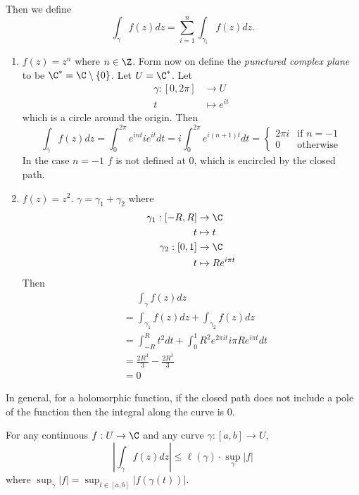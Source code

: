 \documentclass[a4paper]{article}
\begin{document}
Then we define
\[
  \int_\gamma f(z) dz = \sum_{i = 1}^n \int_{\gamma_i} f(z)dz.
\]

\begin{eg}\leavevmode
  \begin{enumerate}
  \item \(f(z) = z^n\) where \(n \in \Z\). Form now on define the \emph{punctured complex plane} to be \(\C^* = \C \setminus \{0\}\). Let \(U = \C^*\). Let
    \begin{align*}
      \gamma: [0, 2\pi] &\to U \\
      t &\mapsto e^{it}
    \end{align*}
    which is a circle around the origin. Then
    \[
      \int_\gamma f(z) dz =
      \int_0^{2\pi} e^{int}ie^{it} dt
      = i\int_0^{2\pi} e^{i(n + 1)t} dt
      =
      \begin{cases}
        2\pi i & \text{if } n = -1 \\
        0 & \text{otherwise}
      \end{cases}
    \]
    In the case \(n = -1\) \(f\) is not defined at \(0\), which is encircled by the closed path.
  \item \(f(z) = z^2\). \(\gamma = \gamma_1 + \gamma_2\) where
    \begin{align*}
      \gamma_1: [-R, R] &\to \C \\
      t &\mapsto t \\
      \gamma_2:[0, 1] &\to \C \\
      t &\mapsto Re^{i\pi t}
    \end{align*}
    Then
    \begin{align*}
      &\phantom{=} \int_\gamma f(z)dz \\
      &= \int_{\gamma_1} f(z)dz + \int_{\gamma_2} f(z) dz \\
      &= \int_{-R}^R t^2dt + \int_0^1 R^2e^{2\pi it}i\pi Re^{i\pi t} dt \\
      &= \frac{2R^3}{3} - \frac{2R^3}{3} \\
      &= 0 
    \end{align*}
  \end{enumerate}
\end{eg}

In general, for a holomorphic function, if the closed path does not include a pole of the function then the integral along the curve is \(0\).

\begin{proposition}
  For any continuous \(f: U \to \C\) and any curve \(\gamma: [a, b] \to U\),
  \[
    \left| \int_\gamma f(z)dz \right| \leq \ell(\gamma) \cdot \sup_\gamma|f|
  \]
  where \(\sup_\gamma |f| = \sup_{t \in [a, b]} |f(\gamma(t))|\).
\end{proposition}
\end{document}
